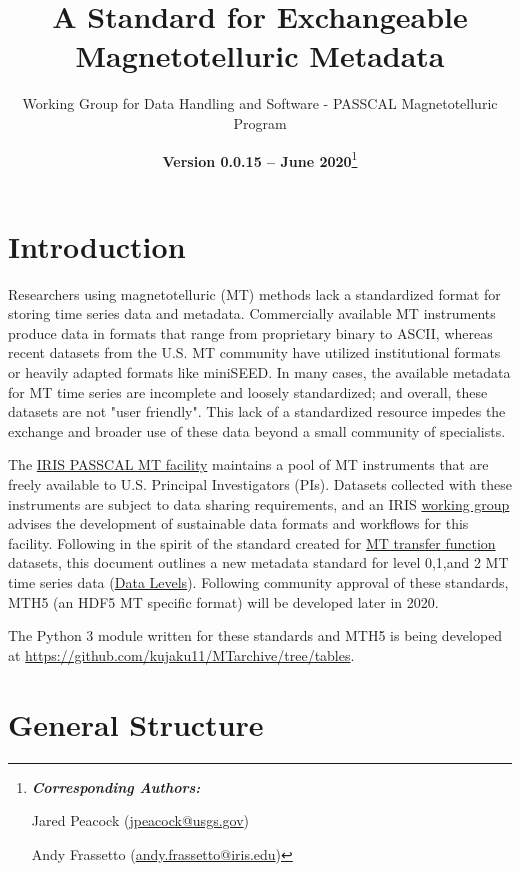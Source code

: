 \documentclass[12pt]{article}
\title{A Standard for Exchangeable Magnetotelluric Metadata}
\date{\textbf{Version 0.0.15 -- June 2020}\footnote{\noindent\textbf{\textit{Corresponding Authors:}}
		
		Jared Peacock (\url{jpeacock@usgs.gov})
		
		Andy Frassetto (\url{andy.frassetto@iris.edu})}}
\author[1]{Working Group for Data Handling and Software - PASSCAL Magnetotelluric Program}
\affil[1]{Portable Array Seismic Studies of the Continental Lithosphere, Incorporated Research Institutions for Seismology}
\begin{document}
	
\maketitle

\clearpage
\newpage
\tableofcontents
{}
\listoftables
\vspace{1cm}


\newpage

\section{Introduction}

Researchers using magnetotelluric (MT) methods lack a standardized format for storing time series data and metadata. Commercially available MT instruments produce data in formats that range from proprietary binary to ASCII, whereas recent datasets from the U.S. MT community have utilized institutional formats or heavily adapted formats like miniSEED. In many cases, the available metadata for MT time series are incomplete and loosely standardized; and overall, these datasets are not "user friendly". This lack of a standardized resource impedes the exchange and broader use of these data beyond a small community of specialists.

The \href{https://www.iris.edu/hq/programs/passcal/magnetotelluric_instrumentation}{IRIS PASSCAL MT facility} maintains a pool of MT instruments that are freely available to U.S. Principal Investigators (PIs). Datasets collected with these instruments are subject to data sharing requirements, and an IRIS \href{https://www.iris.edu/hq/about_iris/governance/mt_soft}{working group} advises the development of sustainable data formats and workflows for this facility. Following in the spirit of the standard created for \href{https://library.seg.org/doi/10.1190/geo2018-0679.1}{MT transfer function} datasets, this document outlines a new metadata standard for level 0,1,and 2 MT time series data (\href{https://earthdata.nasa.gov/collaborate/open-data-services-and-software/data-information-policy/data-levels}{Data Levels}). Following community approval of these standards, MTH5 (an HDF5 MT specific format) will be developed later in 2020.

The Python 3 module written for these standards and MTH5 is being developed at \url{https://github.com/kujaku11/MTarchive/tree/tables}.

\section{General Structure}
\end{document}

